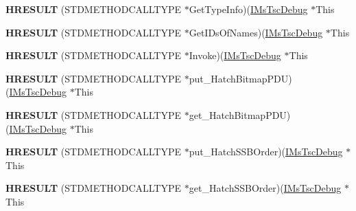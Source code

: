 \begin{DoxyCompactItemize}
{\bfseries H\+R\+E\+S\+U\+LT} (S\+T\+D\+M\+E\+T\+H\+O\+D\+C\+A\+L\+L\+T\+Y\+PE $\ast$Get\+Type\+Info)(\hyperlink{interface_m_s_t_s_c_lib_1_1_i_ms_tsc_debug}{I\+Ms\+Tsc\+Debug} $\ast$This
\item 
\mbox{\label{struct_m_s_t_s_c_lib_1_1_i_ms_tsc_debug_vtbl_aaecc50508e248e475b4962117d28ef54}} 
{\bfseries H\+R\+E\+S\+U\+LT} (S\+T\+D\+M\+E\+T\+H\+O\+D\+C\+A\+L\+L\+T\+Y\+PE $\ast$Get\+I\+Ds\+Of\+Names)(\hyperlink{interface_m_s_t_s_c_lib_1_1_i_ms_tsc_debug}{I\+Ms\+Tsc\+Debug} $\ast$This
\item 
\mbox{\label{struct_m_s_t_s_c_lib_1_1_i_ms_tsc_debug_vtbl_a4a71bf9f7f08d5ba2867c060fd8239fd}} 
{\bfseries H\+R\+E\+S\+U\+LT} (S\+T\+D\+M\+E\+T\+H\+O\+D\+C\+A\+L\+L\+T\+Y\+PE $\ast$Invoke)(\hyperlink{interface_m_s_t_s_c_lib_1_1_i_ms_tsc_debug}{I\+Ms\+Tsc\+Debug} $\ast$This
\item 
\mbox{\label{struct_m_s_t_s_c_lib_1_1_i_ms_tsc_debug_vtbl_a6719e559667d9114f8f4b9e7e0b0bba1}} 
{\bfseries H\+R\+E\+S\+U\+LT} (S\+T\+D\+M\+E\+T\+H\+O\+D\+C\+A\+L\+L\+T\+Y\+PE $\ast$put\+\_\+\+Hatch\+Bitmap\+P\+DU)(\hyperlink{interface_m_s_t_s_c_lib_1_1_i_ms_tsc_debug}{I\+Ms\+Tsc\+Debug} $\ast$This
\item 
\mbox{\label{struct_m_s_t_s_c_lib_1_1_i_ms_tsc_debug_vtbl_adb91229cefcfd2b9d9e0fb5e0de7b480}} 
{\bfseries H\+R\+E\+S\+U\+LT} (S\+T\+D\+M\+E\+T\+H\+O\+D\+C\+A\+L\+L\+T\+Y\+PE $\ast$get\+\_\+\+Hatch\+Bitmap\+P\+DU)(\hyperlink{interface_m_s_t_s_c_lib_1_1_i_ms_tsc_debug}{I\+Ms\+Tsc\+Debug} $\ast$This
\item 
\mbox{\label{struct_m_s_t_s_c_lib_1_1_i_ms_tsc_debug_vtbl_ae0a85d29b43e7c752df7fc268c82cb50}} 
{\bfseries H\+R\+E\+S\+U\+LT} (S\+T\+D\+M\+E\+T\+H\+O\+D\+C\+A\+L\+L\+T\+Y\+PE $\ast$put\+\_\+\+Hatch\+S\+S\+B\+Order)(\hyperlink{interface_m_s_t_s_c_lib_1_1_i_ms_tsc_debug}{I\+Ms\+Tsc\+Debug} $\ast$This
\item 
\mbox{\label{struct_m_s_t_s_c_lib_1_1_i_ms_tsc_debug_vtbl_a7349cb0e8b1d8074904abd8f1e881e67}} 
{\bfseries H\+R\+E\+S\+U\+LT} (S\+T\+D\+M\+E\+T\+H\+O\+D\+C\+A\+L\+L\+T\+Y\+PE $\ast$get\+\_\+\+Hatch\+S\+S\+B\+Order)(\hyperlink{interface_m_s_t_s_c_lib_1_1_i_ms_tsc_debug}{I\+Ms\+Tsc\+Debug} $\ast$This

\end{DoxyCompactItemize}
